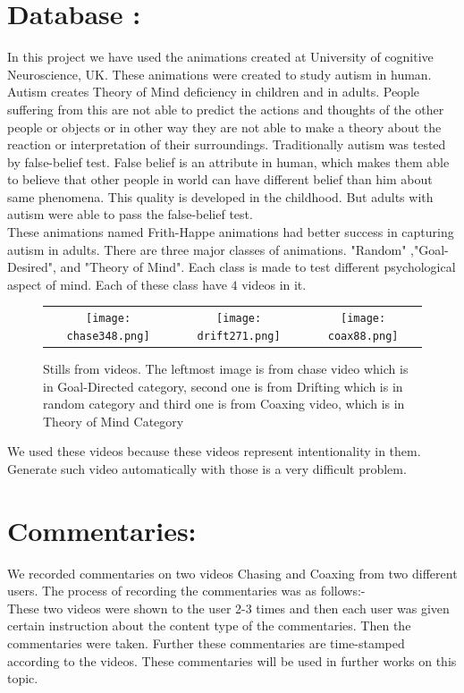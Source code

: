 \documentclass[10pt, twocolumn]{article}
\begin{document}
\section*{Database :}
In this project we have used the animations\cite{fhanimation} created at University of cognitive Neuroscience, UK. These animations were created to study autism in human. Autism creates Theory of Mind deficiency in children and in adults. People suffering from this are not able to predict the actions and thoughts of the other people or objects or in other way they are not able to make a theory about the reaction or interpretation of their surroundings. Traditionally autism was tested by false-belief test. False belief is an attribute in human, which makes them able to believe that other people in world can have different belief than him about same phenomena. This quality is developed in the childhood. But adults with autism were able to pass the false-belief test.\\
\hspace*{10pt} These animations named Frith-Happe animations had better success in capturing autism in adults. There are three major classes of animations. "Random" ,"Goal-Desired", and "Theory of Mind". Each class is made to test different psychological aspect of mind. Each of these class have $4$ videos in it.\\
\begin{figure}[H]
\begin{tabular}{ccc}
\texttt{[image: chase348.png]} &
\texttt{[image: drift271.png]} &
\texttt{[image: coax88.png]}
\end{tabular}    
\label{tab:gt}
\caption{Stills from videos. The leftmost image is from chase video which is in Goal-Directed category, second one is from Drifting which is in random category and third one is from Coaxing video, which is in Theory of Mind Category}
\end{figure}
We used these videos because these videos represent intentionality in them. Generate such video automatically with those is a very difficult problem.
\section*{Commentaries: } We recorded commentaries on two videos Chasing and Coaxing from two different users. The process of recording the commentaries was as follows:-\\
\hspace*{10pt} These two videos were shown to the user 2-3 times and then each user was given certain instruction about the content type of the commentaries. Then the commentaries were taken. Further these commentaries are time-stamped according to the videos. These commentaries will be used in further works on this topic.
\end{document}
